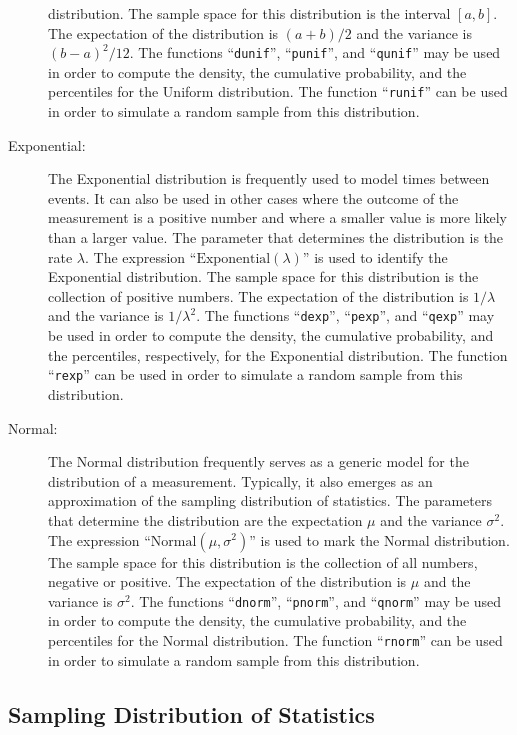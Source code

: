 \documentclass[]{krantz}
\theoremstyle{definition}
\theoremstyle{definition}
\theoremstyle{definition}
\theoremstyle{remark}
\begin{document}
\begin{description}
distribution. The sample space for this distribution is the interval
\([a,b]\). The expectation of the distribution is \((a+b)/2\) and the
variance is \((b-a)^2/12\). The functions ``\texttt{dunif}'',
``\texttt{punif}'', and ``\texttt{qunif}'' may be used in order to
compute the density, the cumulative probability, and the percentiles for
the Uniform distribution. The function ``\texttt{runif}'' can be used in
order to simulate a random sample from this distribution.
\item[Exponential:]
The Exponential distribution is frequently used to model times between
events. It can also be used in other cases where the outcome of the
measurement is a positive number and where a smaller value is more
likely than a larger value. The parameter that determines the
distribution is the rate \(\lambda\). The expression
``\(\mathrm{Exponential}(\lambda)\)'' is used to identify the
Exponential distribution. The sample space for this distribution is the
collection of positive numbers. The expectation of the distribution is
\(1/\lambda\) and the variance is \(1/\lambda^2\). The functions
``\texttt{dexp}'', ``\texttt{pexp}'', and ``\texttt{qexp}'' may be used
in order to compute the density, the cumulative probability, and the
percentiles, respectively, for the Exponential distribution. The
function ``\texttt{rexp}'' can be used in order to simulate a random
sample from this distribution.
\item[Normal:]
The Normal distribution frequently serves as a generic model for the
distribution of a measurement. Typically, it also emerges as an
approximation of the sampling distribution of statistics. The parameters
that determine the distribution are the expectation \(\mu\) and the
variance \(\sigma^2\). The expression
``\(\mathrm{Normal}(\mu,\sigma^2)\)'' is used to mark the Normal
distribution. The sample space for this distribution is the collection
of all numbers, negative or positive. The expectation of the
distribution is \(\mu\) and the variance is \(\sigma^2\). The functions
``\texttt{dnorm}'', ``\texttt{pnorm}'', and ``\texttt{qnorm}'' may be
used in order to compute the density, the cumulative probability, and
the percentiles for the Normal distribution. The function
``\texttt{rnorm}'' can be used in order to simulate a random sample from
this distribution.
\end{description}

\subsection{Sampling Distribution of
Statistics}\label{sampling-distribution-of-statistics}
\end{document}
